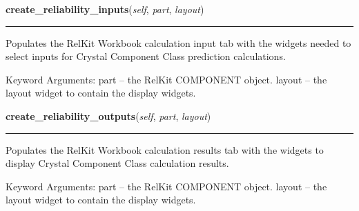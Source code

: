     \label{reliafree:miscellaneous:crystal:Crystal:create_reliability_inputs}

    \vspace{0.5ex}

\hspace{.8\funcindent}\begin{boxedminipage}{\funcwidth}

    \raggedright \textbf{create\_reliability\_inputs}(\textit{self}, \textit{part}, \textit{layout})

    \vspace{-1.5ex}

    \rule{\textwidth}{0.5\fboxrule}
\setlength{\parskip}{2ex}
    Populates the RelKit Workbook calculation input tab with the widgets
    needed to select inputs for Crystal Component Class prediction 
    calculations.

    Keyword Arguments: part   -- the RelKit COMPONENT object. layout -- 
    the layout widget to contain the display widgets.

\setlength{\parskip}{1ex}
    \end{boxedminipage}

    \label{reliafree:miscellaneous:crystal:Crystal:create_reliability_outputs}

    \vspace{0.5ex}

\hspace{.8\funcindent}\begin{boxedminipage}{\funcwidth}

    \raggedright \textbf{create\_reliability\_outputs}(\textit{self}, \textit{part}, \textit{layout})

    \vspace{-1.5ex}

    \rule{\textwidth}{0.5\fboxrule}
\setlength{\parskip}{2ex}
    Populates the RelKit Workbook calculation results tab with the 
    widgets to display Crystal Component Class calculation results.

    Keyword Arguments: part   -- the RelKit COMPONENT object. layout -- 
    the layout widget to contain the display widgets.

\setlength{\parskip}{1ex}
    \end{boxedminipage}

